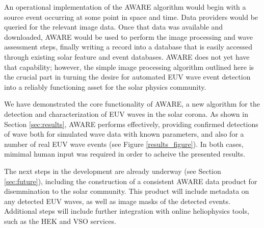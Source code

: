 \documentclass[referee,a4paper,12pt,traditabstract]{swsc}
\begin{document}
\begin{linenumbers}
An operational implementation of the AWARE algorithm would begin with
a source event occurring at some point in space and time.  Data
providers would be queried for the relevant image data.  Once that
data was available and downloaded, AWARE would be used to perform the
image processing and wave assessment steps, finally writing a record
into a database that is easily accessed through existing solar feature
and event databases.  AWARE does not yet have that capability;
however, the simple image processing algorithm outlined here is the
crucial part in turning the desire for automated EUV wave event
detection into a reliably functioning asset for the solar physics
community.

We have demonstrated the core functionality of AWARE, a new algorithm
for the detection and characterization of EUV waves in the solar
corona. As shown in Section \ref{sec:results}, AWARE performs
effectively, providing confirmed detections of wave both for simulated
wave data with known parameters, and also for a number of real EUV
wave events (see Figure \ref{results_figure}). In both cases, mimimal
human input was required in order to acheive the presented results.

The next steps in the development are already underway (see Section
\ref{sec:future}), including the construction of a consistent AWARE
data product for disemmination to the solar community. This product
will include metadata on any detected EUV waves, as well as image
masks of the detected events. Additional steps will include further
integration with online heliophysics tools, such as the HEK and VSO
services.





\end{linenumbers}
\end{document}
